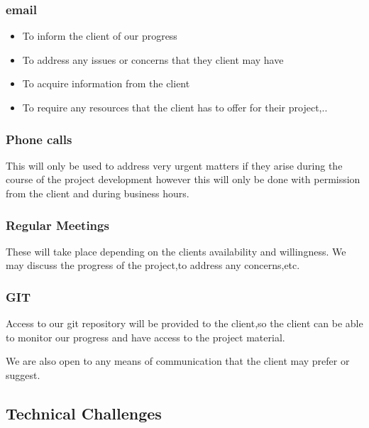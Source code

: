 \documentclass[a4paper,12pt]{article}
\begin{document}
\subsubsection{email}
\begin{itemize}
\item To inform the client of our progress
\item To address any issues or concerns that they client may have
\item To acquire information from the client
\item To require any resources that the client has to offer for their project,..
\end{itemize}

\subsubsection{Phone calls}
 This will only be used to address very urgent matters if they arise during the course of the project development 
 however this will only be done with permission from the client and during business hours.
 
\subsubsection{Regular Meetings}	 
These will take place depending on the clients availability and willingness.
We may discuss the progress of the project,to address any concerns,etc.

\subsubsection{GIT}

Access to our git repository will be provided to the client,so the client can be able to monitor
our progress and have access to the project material.

We are also open to any means of communication that the client may prefer or suggest.

\subsection{Technical Challenges}
\end{document}
